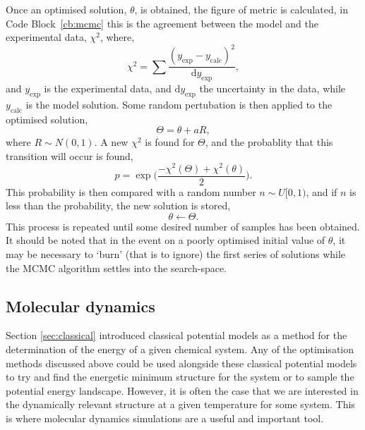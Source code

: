 Once an optimised solution, $\theta$, is obtained, the figure of metric is calculated, in Code Block~\ref{cb:mcmc} this is the agreement between the model and the experimental data, $\chi^2$, where,
%
\begin{equation}
\chi^2 = \sum\frac{(y_{\text{exp}} - y_{\text{calc}})^2}{\text{d}y_{\text{exp}}},
\end{equation}
%
and $y_{\text{exp}}$ is the experimental data, and $\text{d}y_{\text{exp}}$ the uncertainty in the data, while $y_{\text{calc}}$ is the model solution.
Some random pertubation is then applied to the optimised solution,
%
\begin{equation}
\Theta = \theta + aR,
\end{equation}
%
where $R\sim N(0, 1)$.
A new $\chi^2$ is found for $\Theta$, and the probablity that this transition will occur is found,
%
\begin{equation}
p = \exp{\bigg(\frac{-\chi^2(\Theta) + \chi^2(\theta)}{2}\bigg)}.
\end{equation}
%
This probability is then compared with a random number $n\sim U[0, 1)$, and if $n$ is less than the probability, the new solution is stored,
%
\begin{equation}
\theta \leftarrow \Theta.
\end{equation}
%
This process is repeated until some desired number of samples has been obtained.
It should be noted that in the event on a poorly optimised initial value of $\theta$, it may be necessary to `burn' (that is to ignore) the first series of solutions while the MCMC algorithm settles into the search-space.

\subsection{Molecular dynamics}
\label{sec:md}
Section \ref{sec:classical} introduced classical potential models as a method for the determination of the energy of a given chemical system.
Any of the optimisation methods discussed above could be used alongside these classical potential models to try and find the energetic minimum structure for the system or to sample the potential energy landscape.
However, it is often the case that we are interested in the dynamically relevant structure at a given temperature for some system.
This is where molecular dynamics simulations are a useful and important tool.

